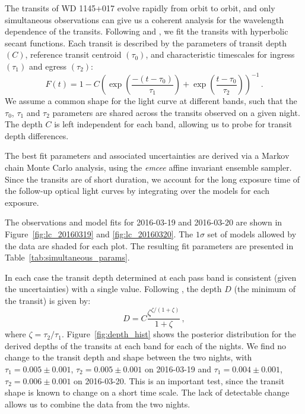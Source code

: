\documentclass[apj]{emulateapj}
\begin{document}
The transits of WD 1145+017 evolve rapidly from orbit to orbit, and only simultaneous observations can give us a coherent analysis for the wavelength dependence of the transits. Following \citet{2014ApJ...784...40R} and \citet{2015arXiv151006434C}, we fit the transits with hyperbolic secant functions. Each transit is described by the parameters of transit depth $(C)$, reference transit centroid $(\tau_0)$, and characteristic timescales for ingress $(\tau_1)$ and egress $(\tau_2)$:
\begin{equation}
\label{eq:model}
  F(t) = 1 - C \left( \exp \left(\frac{-(t-\tau_0)}{\tau_1} \right) + \exp \left(\frac{t-\tau_0}{\tau_2} \right) \right)^{-1}\,.
\end{equation}
We assume a common shape for the light curve at different bands, such that the $\tau_0$, $\tau_1$ and $\tau_2$ parameters are shared across the transits observed on a given night. The depth $C$ is left independent for each band, allowing us to probe for transit depth differences.

The best fit parameters and associated uncertainties are derived via a Markov chain Monte Carlo analysis, using the \emph{emcee} \citep{2013PASP..125..306F} affine invariant ensemble sampler. Since the transits are of short duration, we account for the long exposure time of the follow-up optical light curves by integrating over the models for each exposure.

The observations and model fits for 2016-03-19 and 2016-03-20 are shown in Figure~\ref{fig:lc_20160319} and \ref{fig:lc_20160320}. The $1\sigma$ set of models allowed by the data are shaded for each plot. The resulting fit parameters are presented in Table~\ref{tab:simultaneous_params}. 

In each case the transit depth determined at each pass band is consistent (given the uncertainties) with a single value. Following \citet{2015arXiv151006434C}, the depth $D$ (the minimum of the transit) is given by: 
\begin{equation}
D = C \frac{\zeta^{\zeta/(1+\zeta)} }{1+\zeta}\,,
\end{equation}
where $\zeta = \tau_2/\tau_1$. Figure~\ref{fig:depth_hist} shows the posterior distribution for the derived depths of the transits at each band for each of the nights. We find no change to the transit depth and shape between the two nights, with $\tau_1 = 0.005\pm0.001$, $\tau_2 = 0.005\pm0.001$ on 2016-03-19 and $\tau_1 = 0.004\pm0.001$, $\tau_2 = 0.006\pm0.001$ on 2016-03-20. This is an important test, since the transit shape is known to change on a short time scale. The lack of detectable change allows us to combine the data from the two nights. 
\end{document}
